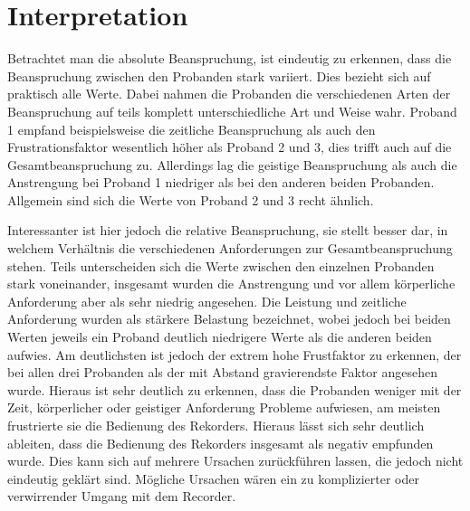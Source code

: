 \section{Interpretation}

Betrachtet man die absolute Beanspruchung, ist eindeutig zu erkennen, dass die Beanspruchung zwischen den Probanden stark variiert. Dies bezieht sich auf praktisch alle Werte. Dabei nahmen die Probanden die verschiedenen Arten der Beanspruchung auf teils komplett unterschiedliche Art und Weise wahr. Proband 1 empfand beispielsweise die zeitliche Beanspruchung als auch den Frustrationsfaktor wesentlich höher als Proband 2 und 3, dies trifft auch auf die Gesamtbeanspruchung zu. Allerdings lag die geistige Beanspruchung als auch die Anstrengung bei Proband 1 niedriger als bei den anderen beiden Probanden. Allgemein sind sich die Werte von Proband 2 und 3 recht ähnlich.

Interessanter ist hier jedoch die relative Beanspruchung, sie stellt besser dar, in welchem Verhältnis die verschiedenen Anforderungen zur Gesamtbeanspruchung stehen. Teils unterscheiden sich die Werte zwischen den einzelnen Probanden stark voneinander, insgesamt wurden die Anstrengung und vor allem körperliche Anforderung aber als sehr niedrig angesehen. Die Leistung und zeitliche Anforderung wurden als stärkere Belastung bezeichnet, wobei jedoch bei beiden Werten jeweils ein Proband deutlich niedrigere Werte als die anderen beiden aufwies. Am deutlichsten ist jedoch der extrem hohe Frustfaktor zu erkennen, der bei allen drei Probanden als der mit Abstand gravierendste Faktor angesehen wurde. Hieraus ist sehr deutlich zu erkennen, dass die Probanden weniger mit der Zeit, körperlicher oder geistiger Anforderung Probleme aufwiesen, am meisten frustrierte sie die Bedienung des Rekorders. Hieraus lässt sich sehr deutlich ableiten, dass die Bedienung des Rekorders insgesamt als negativ empfunden wurde. Dies kann sich auf mehrere Ursachen zurückführen lassen, die jedoch nicht eindeutig geklärt sind. Mögliche Ursachen wären ein zu komplizierter oder verwirrender Umgang mit dem Recorder.
